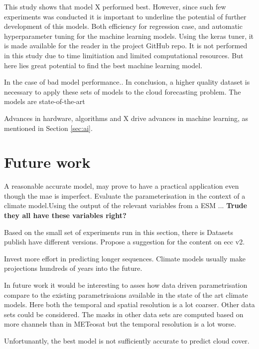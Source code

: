This study shows that model X performed best. However, since such few experiments was conducted it is important to underline the potential of further development of this models. Both efficiency for regression case, and automatic hyperparameter tuning for the machine learning models. Using the keras tuner, it is made available for the reader in the project GitHub repo. It is not performed in this study due to time limitiation and limited computational resources. But here lies great potential to find the best machine learning model. 

In the case of bad model performance.. In conclusion, a higher quality dataset is necessary to apply these sets of models to the cloud forecasting problem. The models are state-of-the-art 

Advances in hardware, algorithms and X drive advances in machine learning, as mentioned in Section \ref{sec:ai}. %

\section{Future work}
A reasonable accurate model, may prove to have a practical application even though the \acrshort{mae} is imperfect. Evaluate the parameterisation in the context of a climate model.Using the output of the relevant variables from a \acrshort{ESM} ... \textbf{Trude they all have these variables right?}

Based on the small set of experiments run in this section, there is 
Datasets publish have different versions. Propose a suggestion for the content on \acrshort{ecc} v2.

Invest more effort in predicting longer sequences. Climate models usually make projections hundreds of years into the future.

In future work it would be interesting to asses how data driven parametrisation compare to the existing parametrisaions available in the state of the art climate models. Here both the temporal and spatial resolution is a lot coarser. Other data sets could be considered. The masks in other data sets are computed based on more channels than in METeosat but the temporal resolution is a lot worse. 

Unfortunantly, the best model is not sufficiently accurate to predict cloud cover. 
